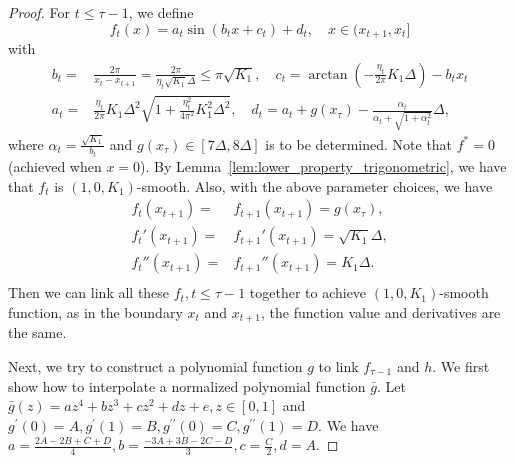 \documentclass{article}
\begin{document}
\begin{proof}
For $t\leq\tau-1$, we define
    \begin{equation}\label{eq:lower_trigonometric}
        f_t(x) = a_t \sin(b_t x+c_t) + d_t, \quad x\in (x_{t+1}, x_t]
    \end{equation}
    with
    \begin{align*}
        b_t =& \frac{2 \pi}{x_{t} - x_{t+1}} = \frac{2\pi}{\eta_t \sqrt{K_1} \Delta} \le \pi \sqrt{K_1} , \quad
        c_t = \arctan\left( - \frac{\eta_t}{2 \pi }K_1 \Delta \right) - b_t x_t \\
        a_t =&\frac{\eta_t}{2 \pi} K_1 \Delta^2 \sqrt{1 + \frac{\eta_t^2}{4\pi^2 } K_1^2 \Delta^2} , \quad 
        d_t = a_t+g(x_\tau)-\frac{\alpha_t}{\alpha_t+\sqrt{1+\alpha_t^2}}\Delta,
    \end{align*}
    where $\alpha_t=\frac{\sqrt{K_1}}{b_t}$ and 
    $g(x_\tau)\in[7\Delta,8\Delta]$ is to be determined.
    Note that $f^* = 0$ (achieved when $x=0$).
    By Lemma~\ref{lem:lower_property_trigonometric}, we have that $f_t$ is $(1,0,K_1)$-smooth.
     Also, with the above parameter choices, we have
    \begin{align*}
        f_t(x_{t+1}) =& f_{t+1}(x_{t+1}) = g(x_\tau), \\
        f_t'(x_{t+1}) =& f_{t+1}'(x_{t+1}) = \sqrt{K_1} \Delta, \\
        f_t''(x_{t+1}) =& f_{t+1}''(x_{t+1}) = K_1 \Delta. \\
    \end{align*}
    Then we can link all these $f_t,t\leq\tau-1$ together to achieve $(1,0, K_1)$-smooth function, as in the boundary $x_t$ and $x_{t+1}$, the function value and derivatives are the same.

Next, we try to construct a polynomial function $g$ to link $f_{\tau-1}$ and $h$. 
We first show how to interpolate a normalized polynomial function $\bar{g}$.
Let
$\bar{g}(z)=az^4+bz^3+cz^2+dz+e,z\in[0,1]$
and
$g^\prime(0)=A,g^\prime(1)=B,g^{\prime\prime}(0)=C,g^{\prime\prime}(1)=D$. We have
$a=\frac{2A-2B+C+D}{4},b=\frac{-3A+3B-2C-D}{3},c=\frac{C}{2},d=A$. 


\end{proof}
\end{document}

